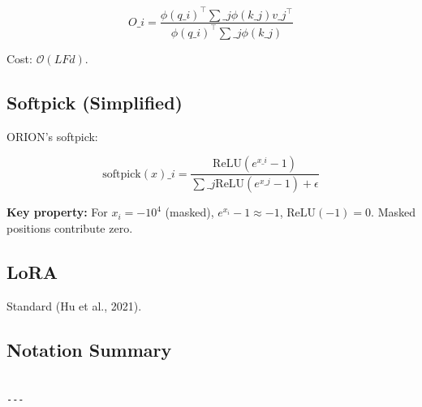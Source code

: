 \[
O\_i = \frac{\phi(q\_i)^\top \sum\_j \phi(k\_j) v\_j^\top}{\phi(q\_i)^\top \sum\_j \phi(k\_j)}
\tag{3.5}
\]

Cost: $\mathcal{O}(L F d)$.

\subsection{Softpick (Simplified)}

ORION's softpick:

\[
\text{softpick}(x)\_i = \frac{\text{ReLU}(e^{x\_i} - 1)}{\sum\_j \text{ReLU}(e^{x\_j} - 1) + \epsilon}
\tag{3.6}
\]

\textbf{Key property:} For $x_i = -10^4$ (masked), $e^{x_i} - 1 \approx -1$, 
$\text{ReLU}(-1) = 0$. Masked positions contribute zero.

\subsection{LoRA}

Standard (Hu et al., 2021).

\subsection{Notation Summary}

\begin{lstlisting}

---
\end{lstlisting}
